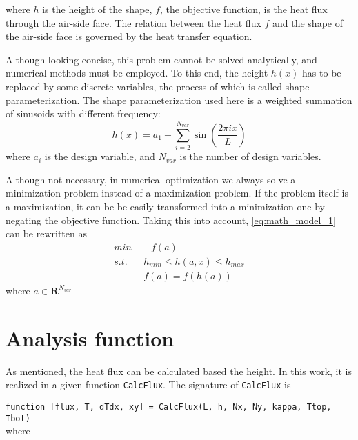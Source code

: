 \documentclass[a4paper]{article}
\begin{document}
where $h$ is the height of the shape, $f$, the objective function, is the heat flux through the air-side face. The relation between the heat flux $f$ and the shape of the air-side face is governed by the heat transfer equation.

Although looking concise, this problem cannot be solved analytically, and numerical methods must be employed. To this end, the height $h(x)$ has to be replaced by some discrete variables, the process of which is called shape parameterization. The shape parameterization used here is a weighted summation of sinusoids with different frequency:
\begin{equation}
h(x) = a_1 + \sum_{i=2}^{N_{var}} \sin(\frac{2\pi i x}{L})
\end{equation}
where $a_i$ is the design variable, and $N_{var}$ is the number of design variables.

Although not necessary, in numerical optimization we always solve a minimization problem instead of a maximization problem. If the problem itself is a maximization, it can be be easily transformed into a minimization one by negating the objective function. Taking this into account, \eqref{eq:math_model_1} can be rewritten as
\begin{equation}
\begin{aligned}
min\:\: &-f(a) \\
s.t.\:\: & h_{min} \le h(a,x) \le h_{max}\\
& f(a) = f(h(a))
\end{aligned}
\end{equation}
where $a \in \mathbf{R}^{N_{var}}$

\section{Analysis function} \label{sec:analysis_tool}
As mentioned, the heat flux can be calculated based the height. In this work, it is realized in a given function \texttt{CalcFlux}. The signature of \texttt{CalcFlux} is 

\texttt{function [flux, T, dTdx, xy] = CalcFlux(L, h, Nx, Ny, kappa, Ttop, Tbot)} \\
where
\end{document}
